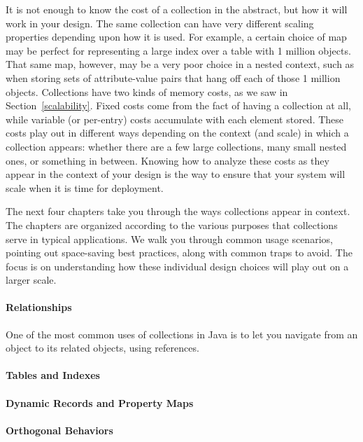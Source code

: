 It is not enough to know the cost
of a collection in the abstract, but how it will work in your design. The same collection can
have very different scaling properties depending upon how it is used. For
example, a certain choice of map may be perfect for representing a large index over a table with 1 million objects. 
That same map, however, may be a very poor
choice in a nested context, such as when storing sets of attribute-value 
pairs that hang off each of those 1 million objects.
Collections have two kinds of memory costs, as we saw in
Section~\ref{scalability}. Fixed costs come from the fact of having a
collection at all, while variable (or per-entry) costs accumulate with each element stored. These costs play out in different ways depending on
the context (and scale) in which a collection appears: whether there are a few
large collections, many small nested ones, or something in between.
Knowing how to analyze these costs as they appear in
the context of your design is the way to ensure that your system will scale
when it is time for deployment.

The next four chapters take you through the ways collections appear in context. 
The chapters are organized according to the various purposes that collections
serve in typical applications.  We walk you through common usage
scenarios, pointing out space-saving best
practices, along with common traps to avoid. The focus is on understanding how
these individual design choices will play out on a larger scale.


\paragraph{Relationships}  One of the most common uses of collections in Java is
to let you navigate from an object to its related objects, using references.
\paragraph{Tables and Indexes}
\paragraph{Dynamic Records and Property Maps}
\paragraph{Orthogonal Behaviors}


